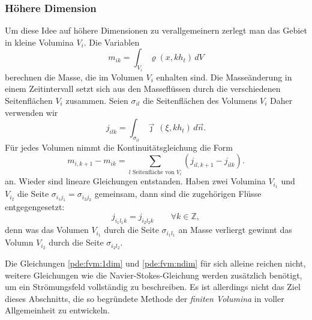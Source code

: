 \subsubsection{Höhere Dimension}
Um diese Idee auf höhere Dimensionen zu verallgemeinern zerlegt man
das Gebiet in kleine Volumina $V_i$.
Die Variablen
\[
m_{ik} = \int_{V_i} \varrho(x, kh_t)\, dV
\]
berechnen die Masse, die im Volumen $V_i$ enhalten sind.
Die Masseänderung in einem Zeitintervall setzt sich aus den
Masseflüssen durch die verschiedenen Seitenflächen $V_i$ 
zusammen.
Seien $\sigma_{il}$ die Seitenflächen des Volumens $V_i$
Daher verwenden wir 
\[
j_{ilk} = \int_{\sigma_{il}} \vec{\jmath}\,(\xi, kh_t)\,d\vec{n}.
\]
Für jedes Volumen nimmt die Kontinuitätsgleichung die Form
\begin{equation}
m_{i,k+1}-m_{ik}
=
\sum_{\text{$l$ Seitenfläche von $V_i$}} (j_{il,k+1}-j_{ilk}).
\label{pde:fvm:ndim}
\end{equation}
an.
Wieder sind lineare Gleichungen entstanden.
Haben zwei Volumina $V_{i_1}$ und $V_{i_2}$ die Seite
$\sigma_{i_1j_1}=\sigma_{i_2j_2}$ gemeinsam, dann sind die 
zugehörigen Flüsse entgegengesetzt:
\[
j_{i_1l_1k}=j_{i_2l_2k}
\qquad\forall k\in\mathbb Z,
\]
denn was das Volumen $V_{i_1}$ durch die Seite $\sigma_{i_1l_1}$ an
Masse verliergt gewinnt das Volumn $V_{i_2}$ durch die Seite
$\sigma_{i_2l_2}$.

Die Gleichungen \eqref{pde:fvm:1dim} und \eqref{pde:fvm:ndim} für
sich alleine reichen nicht, weitere Gleichungen wie die
Navier-Stokes-Gleichung werden zusätzlich benötigt, um ein Strömungsfeld
vollständig zu beschreiben.
%
Es ist allerdings nicht das Ziel dieses Abschnitts, die so
begründete Methode
der {\em finiten Volumina} in voller Allgemeinheit zu entwickeln.
%





